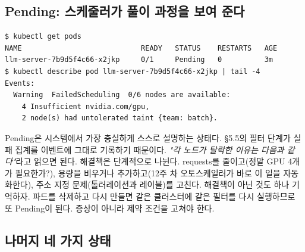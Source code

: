\subsection*{Pending: 스케줄러가 풀이 과정을 보여 준다}

\begin{terminalbox}
\begin{Verbatim}[breaklines=true,breakanywhere=true,fontsize=\small,formatcom=\color{tbbtermfg},codes=\tbbcodeactive]
$ kubectl get pods
NAME                            READY   STATUS    RESTARTS   AGE
llm-server-7b9d5f4c66-x2jkp     0/1     Pending   0          3m
$ kubectl describe pod llm-server-7b9d5f4c66-x2jkp | tail -4
Events:
  Warning  FailedScheduling  0/6 nodes are available:
    4 Insufficient nvidia.com/gpu,
    2 node(s) had untolerated taint {team: batch}.
\end{Verbatim}
\end{terminalbox}

Pending은 시스템에서 가장 충실하게 스스로 설명하는 상태다. §5.5의 필터 단계가 실패 집계를 이벤트에 그대로 기록하기 때문이다. \textit{"각 노드가 탈락한 이유는 다음과 같다"}라고 읽으면 된다. 해결책은 단계적으로 나뉜다. requests를 줄이고(정말 GPU 4개가 필요한가?), 용량을 비우거나 추가하고(12주 차 오토스케일러가 바로 이 일을 자동화한다), 주소 지정 문제(톨러레이션과 레이블)를 고친다. 해결책이 아닌 것도 하나 기억하자. 파드를 삭제하고 다시 만들면 같은 클러스터에 같은 필터를 다시 실행하므로 또 Pending이 된다. 증상이 아니라 제약 조건을 고쳐야 한다.

\subsection*{나머지 네 가지 상태}

